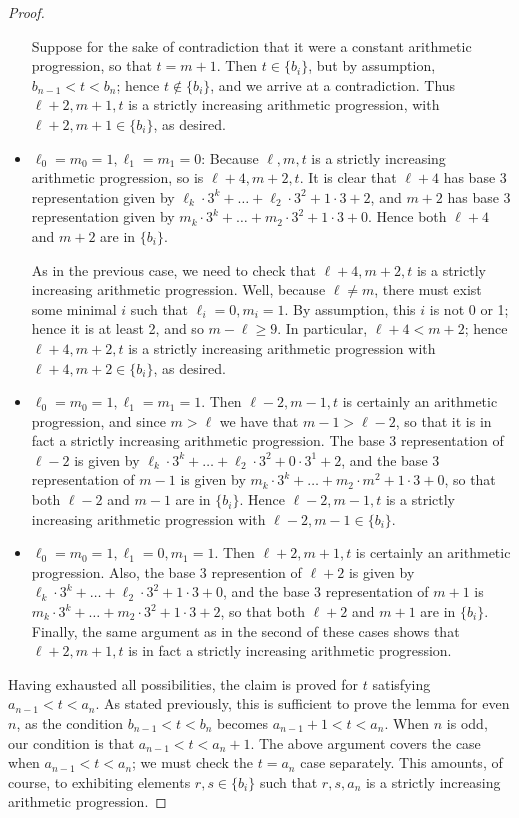 \documentclass[11pt,letterpaper,twoside,english]{article}
\theoremstyle{theorem}
\theoremstyle{remark}
\begin{document}
\begin{proof}
\begin{itemize}
Suppose for the sake of contradiction that it were a constant arithmetic progression, so that $t=m+1$. Then $t\in \{b_i\}$, but by assumption, $b_{n-1}<t<b_n$; hence $t\not\in \{b_i\}$, and we arrive at a contradiction. Thus $\ell+2, m+1, t$ is a strictly increasing arithmetic progression, with $\ell+2, m+1\in \{b_i\}$, as desired.
\item $\ell_0=m_0=1, \ell_1=m_1=0$: Because $\ell, m, t$ is a strictly increasing arithmetic progression, so is $\ell+4, m+2, t$. It is clear that $\ell+4$ has base 3 representation given by $\ell_k\cdot 3^k+\ldots + \ell_2\cdot 3^2 + 1\cdot 3 + 2$, and $m+2$ has base 3 representation given by $m_k\cdot 3^k+\ldots + m_2\cdot 3^2+1\cdot 3 + 0$. Hence both $\ell+4$ and $m+2$ are in $\{b_i\}$. 

As in the previous case, we need to check that $\ell+4, m+2, t$ is a strictly increasing arithmetic progression. Well, because $\ell\neq m$, there must exist some minimal $i$ such that $\ell_i=0, m_i=1$. By assumption, this $i$ is not 0 or 1; hence it is at least 2, and so $m-\ell\geq 9$. In particular, $\ell+4<m+2$; hence $\ell+4, m+2, t$ is a strictly increasing arithmetic progression with $\ell+4, m+2\in \{b_i\}$, as desired.
\item $\ell_0=m_0=1, \ell_1=m_1=1$. Then $\ell-2, m-1, t$ is certainly an arithmetic progression, and since $m>\ell$ we have that $m-1>\ell-2$, so that it is in fact a strictly increasing arithmetic progression. The base 3 representation of $\ell-2$ is given by $\ell_k\cdot 3^k+\ldots + \ell_2\cdot 3^2 + 0\cdot 3^1 + 2$, and the base 3 representation of $m-1$ is given by $m_k\cdot 3^k+\ldots + m_2\cdot m^2 + 1\cdot 3 + 0$, so that both $\ell-2$ and $m-1$ are in $\{b_i\}$. Hence $\ell-2, m-1, t$ is a strictly increasing arithmetic progression with $\ell-2, m-1\in \{b_i\}$.
\item $\ell_0=m_0=1, \ell_1=0, m_1=1$. Then $\ell+2, m+1, t$ is certainly an arithmetic progression. Also, the base 3 represention of $\ell+2$ is given by $\ell_k\cdot 3^k+\ldots + \ell_2\cdot 3^2+ 1\cdot 3 + 0$, and the base 3 representation of $m+1$ is $m_k\cdot 3^k+\ldots + m_2\cdot 3^2 + 1\cdot 3 + 2$, so that both $\ell+2$ and $m+1$ are in $\{b_i\}$. Finally, the same argument as in the second of these cases shows that $\ell+2, m+1, t$ is in fact a strictly increasing arithmetic progression.
\end{itemize}
Having exhausted all possibilities, the claim is proved for $t$ satisfying $a_{n-1}<t<a_n$. 
As stated previously, this is sufficient to prove the lemma for even $n$, as the condition $b_{n-1}<t<b_n$ becomes $a_{n-1}+1<t<a_n$. When $n$ is odd, our condition is that $a_{n-1}<t<a_n+1$. The above argument covers the case when $a_{n-1}<t<a_n$; we must check the $t=a_n$ case separately. This amounts, of course, to exhibiting elements $r, s \in \{b_i\}$ such that $r,s, a_n$ is a strictly increasing arithmetic progression.


\end{proof}
\end{document}
